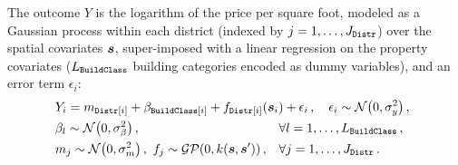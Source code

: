 \documentclass{article}
\begin{document}
The outcome $Y$ is the logarithm of the price per square foot, 
modeled as a Gaussian process within each district (indexed by \(j=1,\dotsc,J_{\mathtt{Distr}}\)) over the spatial covariates \(\bm{s}\), super-imposed with a linear regression on the property covariates (\(L_{\mathtt{BuildClass}}\) building categories encoded as dummy variables), and an error term $\epsilon_i$:
\begin{equation}
    \begin{aligned}
        & Y_i = %
        	m_{\district\sbr{i}} + \beta_{\building\sbr{i}}
        	+ f_{\district\sbr{i}}(\svec_i) + \epsilon_i 
			\,,\quad
 			\epsilon_i \sim \normal\del{0, \sigma_y^2} 
			\,,
			\phantom{\hspace{-10cm}} %
            \\
        & \beta_{l} \sim \normal\del{0, \sigma_\beta^2}
			\,,
			&&
			\forall
			l=1,\dotsc,L_\building \,, \\
        & m_{j} \sim \normal\del{0, \sigmamu^2}
        \,,\ 
        f_j \sim \GP\del{0, k(\svec, \svec')}
			\,,
			&&
			\forall
			j=1,\dotsc,J_\district
		\,.
    \end{aligned}
    \label{eq:nyc_model}
\end{equation}
\end{document}
